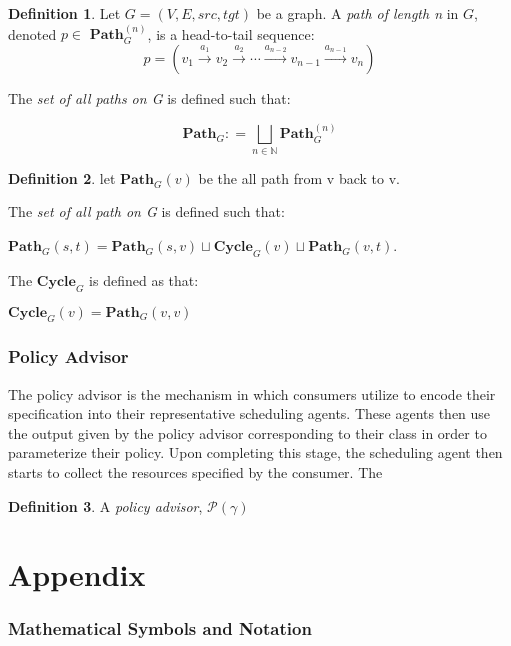 \documentclass{article}
\theoremstyle{definition}
\newtheorem{definition}{Definition}[section]
\theoremstyle{remark}
\newcommand{\path}[2]{\mathbf{Path}^{#2}_{#1}}
\newcommand{\pathall}[1]{\mathbf{Path}_{#1}}
\newcommand{\cyclepath}[1]{\mathbf{Cycle}_{#1}}
\newcommand{\labeledarrow}[1]{\stackrel{#1}{\rightarrow}}
\begin{document}
		\begin{definition} 
			Let $G = (V, E, src, tgt)$ be a graph. A \emph{path of length n} in $G$, denoted $p \in$ $\path{G}{(n)}$, is a head-to-tail sequence:
			\[
			p = (v_{1}   \labeledarrow{a_{1}}   v_{2}   \labeledarrow{a_{2}}  \cdots   \labeledarrow{a_{n-2}}  v_{n-1}   \labeledarrow{a_{n-1}}   v_{n})
			\]
			
			The \emph{set of all paths on G} is defined such that: 
			
			\[
			\pathall{G} : = \bigsqcup_{n \in \mathbb{N}}{\path{G}{(n)}}
			\]
		\end{definition}
		
		\begin{definition}
			let $\pathall{G}(v)$ be the all path from v back to v.
			
			The \emph{set of all path on G} is defined such that:
			
			$\pathall{G}(s,t) = \pathall{G}(s,v)\sqcup \cyclepath{G}(v) \sqcup \pathall{G}(v,t)$.
			
			The $\cyclepath{G}$ is defined as that:
			
			$\cyclepath{G}(v) = \pathall{G}(v,v)$
		\end{definition}

	

	\section{Policy Advisor}
	The policy advisor is the mechanism in which consumers utilize to encode their specification into their
    representative scheduling agents. These agents then use the output given by the policy advisor corresponding
    to their class in order to parameterize their policy. Upon completing this stage, the scheduling agent
    then starts to collect the resources specified by the consumer. The

    \begin{definition}
        A \emph{policy advisor}, $\mathcal{P}(\gamma)$
    \end{definition}


	


	\newpage    

	\part{Appendix}
	\section{Mathematical Symbols and Notation}
		\mbox{}
			\nomenclature{$\rho$}
	\printnomenclature
	\newpage
	
\end{document}

